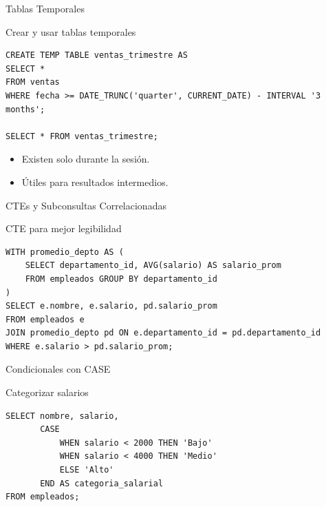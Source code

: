 \documentclass[aspectratio=169, 10pt, xcolor=table]{beamer}
\begin{document}
\begin{frame}[fragile]{Tablas Temporales}
    \begin{block}{Crear y usar tablas temporales}
        \begin{lstlisting}
CREATE TEMP TABLE ventas_trimestre AS
SELECT *
FROM ventas
WHERE fecha >= DATE_TRUNC('quarter', CURRENT_DATE) - INTERVAL '3 months';

SELECT * FROM ventas_trimestre;
        \end{lstlisting}
    \end{block}
    \begin{itemize}
        \item Existen solo durante la sesión.
        \item Útiles para resultados intermedios.
    \end{itemize}
\end{frame}

\begin{frame}[fragile]{CTEs y Subconsultas Correlacionadas}
    \begin{block}{CTE para mejor legibilidad}
        \begin{lstlisting}
WITH promedio_depto AS (
    SELECT departamento_id, AVG(salario) AS salario_prom
    FROM empleados GROUP BY departamento_id
)
SELECT e.nombre, e.salario, pd.salario_prom
FROM empleados e
JOIN promedio_depto pd ON e.departamento_id = pd.departamento_id
WHERE e.salario > pd.salario_prom;
        \end{lstlisting}
    \end{block}
\end{frame}

\begin{frame}[fragile]{Condicionales con CASE}
    \begin{block}{Categorizar salarios}
        \begin{lstlisting}
SELECT nombre, salario,
       CASE
           WHEN salario < 2000 THEN 'Bajo'
           WHEN salario < 4000 THEN 'Medio'
           ELSE 'Alto'
       END AS categoria_salarial
FROM empleados;
        \end{lstlisting}
    \end{block}
\end{frame}
\end{document}
